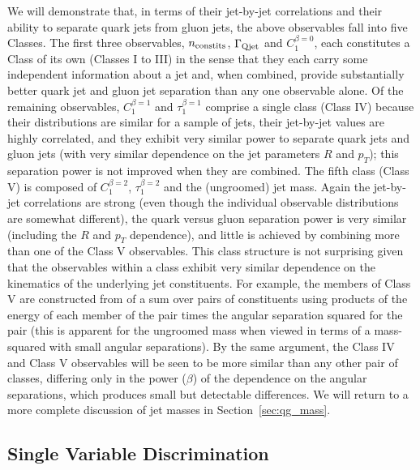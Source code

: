We will demonstrate that, in terms of their jet-by-jet correlations and their ability to separate quark jets from gluon jets, 
the above observables fall into five Classes.  The first three observables, $n_{\rm constits}$, 
$\Gamma_{\rm Qjet}$ and $C_1^{\beta=0}$, each constitutes a Class of its own  (Classes I to III) in the sense that they each carry some independent information 
about a jet and, when combined, provide substantially better quark jet and gluon jet separation than any one observable alone.  Of the remaining
observables, $C_1^{\beta=1}$ and $\tau_1^{\beta=1}$ comprise a single class (Class IV) because their distributions are  similar 
for a sample of jets, their jet-by-jet values are highly correlated, and they exhibit very similar power to separate 
quark jets and gluon jets (with very similar dependence on the jet parameters $R$ and $p_T$); this separation power is not improved
when they are combined.  The fifth class (Class V) is composed of $C_1^{\beta=2}$, $\tau_1^{\beta=2}$ and the (ungroomed) jet mass.  Again the 
jet-by-jet correlations are strong (even though the individual observable distributions are somewhat different), the quark versus gluon separation power is very similar
(including the $R$ and $p_T$ dependence), and little is achieved by combining more than one of the Class V observables.  This class structure is
not surprising given that the observables within a class exhibit very similar dependence on the kinematics of the underlying jet constituents.%
For example, the members of Class V are constructed from of a sum over pairs of constituents using products of the energy of each member 
of the pair times the angular separation squared for the pair (this is apparent for the ungroomed mass when viewed in terms of a mass-squared with small angular separations).  
By the same argument, the Class IV and Class V observables will be seen to be more similar than any other pair of classes, differing only in the
power ($\beta$) of the dependence on the angular separations, which  produces small but detectable differences.  
We will return to
 a more complete discussion of jet masses in Section~\ref{sec:qg_mass}.


\subsection{Single Variable Discrimination}


